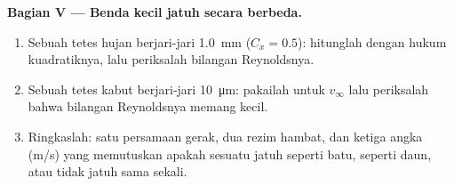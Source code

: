 \begin{problem}
\medskip
\noindent\textbf{Bagian V --- Benda kecil jatuh secara berbeda.}
\begin{enumerate}[resume]
  \item Sebuah tetes hujan berjari-jari \qty{1.0}{mm} ($C_x = 0.5$):
        hitunglah  dengan hukum kuadratiknya, lalu
        periksalah bilangan Reynoldsnya.
  \item Sebuah tetes kabut berjari-jari \qty{10}{\micro m}: pakailah
         untuk $v_\infty$ lalu periksalah bahwa bilangan
        Reynoldsnya memang kecil.
  \item Ringkaslah: satu persamaan gerak, dua rezim hambat, dan ketiga
        angka (\unit{m/s}) yang memutuskan apakah sesuatu jatuh seperti
        batu, seperti daun, atau tidak jatuh sama sekali.
\end{enumerate}
\end{problem}
